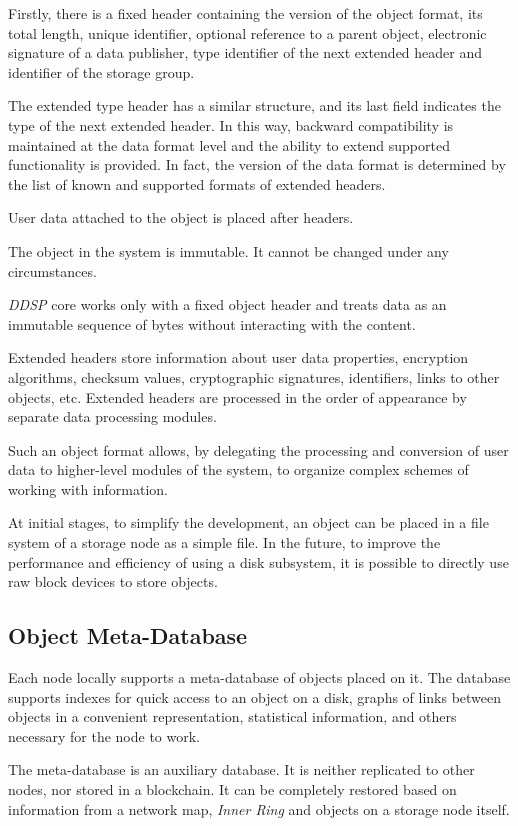 \documentclass[a4paper, 11pt]{article}
\begin{document}
Firstly, there is a fixed header containing the version of the object format, its
total length, unique identifier, optional reference to a parent object,
electronic signature of a data publisher, type identifier of the
next extended header and identifier of the storage group.

The extended type header has a similar structure, and its last field indicates
the type of the next extended header. In this way, backward compatibility is
maintained at the data format level and the ability to extend supported functionality
is provided. In fact, the version of the data format is determined by the list of
known and supported formats of extended headers.

User data attached to the object is placed after headers.

The object in the system is immutable. It cannot be changed under any
circumstances.

\textit{DDSP} core works only with a fixed object
header and treats data as an immutable sequence of bytes without interacting
with the content.

Extended headers store information about user data properties, encryption
algorithms, checksum values, cryptographic signatures, identifiers, links to
other objects, etc. Extended headers are processed in the order of appearance by
separate data processing modules.

Such an object format allows, by delegating the processing and conversion of
user data to higher-level modules of the system, to organize complex schemes of
working with information.

At initial stages, to simplify the development, an object can be placed in a
file system of a storage node as a simple file. In the future, to improve the
performance and efficiency of using a disk subsystem, it is possible to directly use
raw block devices to store objects.

\subsection{Object Meta-Database}

Each node locally supports a meta-database of objects placed on it. The database
supports indexes for quick access to an object on a disk, graphs of links
between objects in a convenient representation, statistical information, and others
 necessary for the node to work.

The meta-database is an auxiliary database. It is neither replicated to other
nodes, nor stored in a blockchain. It can be completely restored based on
information from a network map, \textit{Inner Ring} and objects on a storage
node itself.
\end{document}
